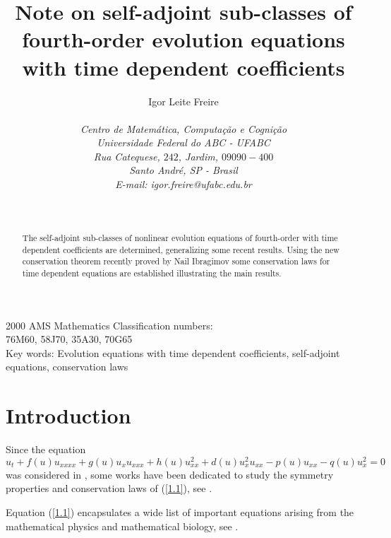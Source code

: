 \documentclass[11pt,letterpaper,twoside]{article}
\newcommand{\bb}{\begin{equation}}
\newcommand{\ee}{\end{equation}}
\begin{document}
\title{\huge \bf Note on self-adjoint sub-classes of fourth-order evolution equations with time dependent coefficients}
\author{\rm \large Igor Leite Freire \\
\\
\it Centro de Matemática, Computação e Cognição\\ \it Universidade Federal do ABC - UFABC\\ \it 
Rua Catequese, $242$,
Jardim,
$09090-400$\\\it Santo André, SP - Brasil\\
\rm E-mail: igor.freire@ufabc.edu.br\\}
\date{\ }
\maketitle
\vspace{1cm}
\begin{abstract}
The self-adjoint sub-classes of nonlinear evolution equations of fourth-order with time dependent coefficients are determined, generalizing some recent results. Using the new conservation theorem recently proved by Nail Ibragimov some conservation laws for time dependent equations are established illustrating the main results.
\end{abstract}
\vskip 1cm
\begin{center}
{2000 AMS Mathematics Classification numbers:\vspace{0.2cm}\\
76M60, 58J70, 35A30, 70G65\vspace{0.2cm} \\
Key words: Evolution equations with time dependent coefficients, self-adjoint equations, conservation laws}
\end{center}
\newpage

\section{Introduction}

Since the equation
\bb\label{1.1}
u_{t}+f(u)u_{xxxx}+g(u)u_{x}u_{xxx}+h(u)u_{xx}^{2}+d(u)u_{x}^{2}u_{xx}-p(u)u_{xx}-q(u)u_{x}^{2}=0
\ee
was considered in \cite{qu}, some works have been dedicated to study the symmetry properties and conservation laws of (\ref{1.1}), see \cite{ib1,i1,ga}. 

Equation (\ref{1.1}) encapsulates a wide list of important equations arising from the mathematical physics and mathematical biology, see \cite{ib1,qu,i1}. 
\end{document}
